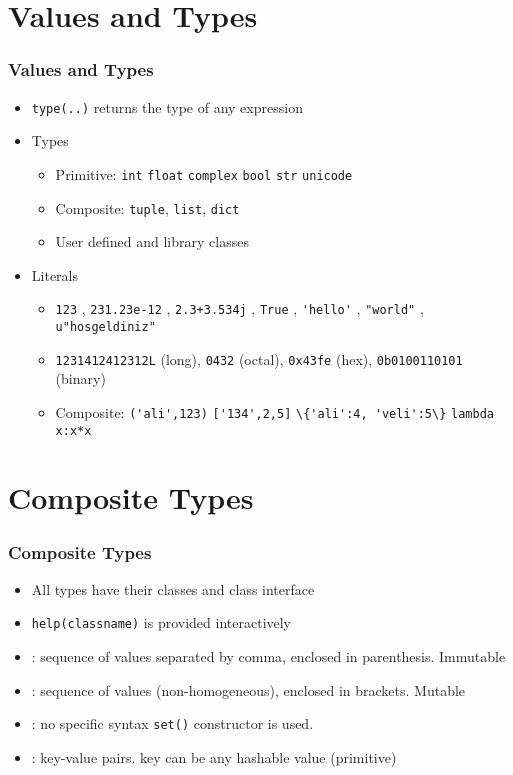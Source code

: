 \documentclass[trans,compress,xcolor=table]{beamer}
\begin{document}
\section{Values and Types}
\begin{frame}
\frametitle{Values and Types}
\begin{itemize}
\item \lstinline!type(..)! returns the type of any expression
\item Types
	\begin{itemize}
	\item Primitive: \lstinline!int! \lstinline!float! \lstinline!complex! \lstinline!bool! \lstinline!str! \lstinline!unicode!
	\item Composite: \lstinline!tuple!, \lstinline!list!, \lstinline!dict!
	\item User defined and library classes
	\end{itemize}
\item Literals
	\begin{itemize}
		\item \lstinline!123! , \lstinline!231.23e-12! ,  \lstinline!2.3+3.534j!  , \lstinline!True!   , \lstinline!'hello'!  , \lstinline!"world"!  , \lstinline!u"hosgeldiniz"!
		\item \lstinline!1231412412312L! (long), \lstinline!0432! (octal), \lstinline!0x43fe! (hex),
			\lstinline!0b0100110101! (binary)
		\item Composite: \lstinline!('ali',123)! \lstinline!['134',2,5]! \lstinline!\{'ali':4, 'veli':5\}! \lstinline!lambda x:x*x!
	\end{itemize}
\end{itemize}
\end{frame}

\section{Composite Types}
\begin{frame}
\frametitle{Composite Types}
\begin{itemize}
\item All types have their classes and class interface
\item \lstinline!help(classname)! is provided interactively
\item {}: sequence of values separated by comma, enclosed in parenthesis. Immutable
\item {}: sequence of values (non-homogeneous), enclosed in brackets. Mutable
\item {}: no specific syntax \lstinline!set()! constructor is used.
\item {}: key-value pairs. key can be any hashable value (primitive)
\end{itemize}
\end{frame}
\end{document}

